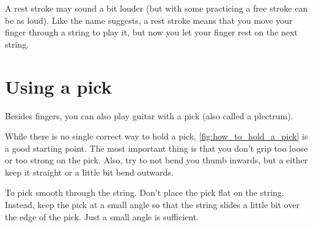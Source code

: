 A rest stroke may sound a bit louder (but with some practicing a free stroke can be as loud). Like the name suggests, a rest stroke means that you move your finger through a string to play it, but now you let your finger rest on the next string.

\section{Using a pick}

Besides fingers, you can also play guitar with a pick (also called a plectrum).

While there is no single correct way to hold a pick, \autoref{fig:how_to_hold_a_pick} is a good starting point. The most important thing is that you don't grip too loose or too strong on the pick. Also, try to not bend you thumb inwards, but a either keep it straight or a little bit bend outwards.

To pick smooth through the string. Don't place the pick flat on the string. Instead, keep the pick at a small angle so that the string slides a little bit over the edge of the pick. Just a small angle is sufficient.

